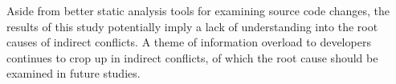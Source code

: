 Aside from better static analysis tools for examining source code changes,
the results of this study potentially imply a lack of understanding into the
root causes of indirect conflicts.  A theme of information overload to developers
continues to crop up in indirect conflicts, of which the root cause should
be examined in future studies.